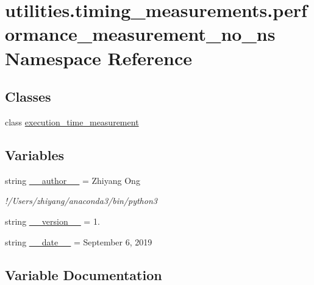 \hypertarget{namespaceutilities_1_1timing__measurements_1_1performance__measurement__no__ns}{}\section{utilities.\+timing\+\_\+measurements.\+performance\+\_\+measurement\+\_\+no\+\_\+ns Namespace Reference}
\label{namespaceutilities_1_1timing__measurements_1_1performance__measurement__no__ns}
\subsection*{Classes}
\begin{DoxyCompactItemize}
\item 
class \hyperlink{classutilities_1_1timing__measurements_1_1performance__measurement__no__ns_1_1execution__time__measurement}{execution\+\_\+time\+\_\+measurement}
\end{DoxyCompactItemize}
\subsection*{Variables}
\begin{DoxyCompactItemize}
\item 
string \hyperlink{namespaceutilities_1_1timing__measurements_1_1performance__measurement__no__ns_ad21212ef2a99b878f1d71f04b282ee93}{\+\_\+\+\_\+author\+\_\+\+\_\+} = \textquotesingle{}Zhiyang Ong\textquotesingle{}
\begin{DoxyCompactList}\small\item\em !/\+Users/zhiyang/anaconda3/bin/python3 \end{DoxyCompactList}\item 
string \hyperlink{namespaceutilities_1_1timing__measurements_1_1performance__measurement__no__ns_aad2678d45f225046185eb85ebe3cdc6a}{\+\_\+\+\_\+version\+\_\+\+\_\+} = \textquotesingle{}1.\textquotesingle{}
\item 
string \hyperlink{namespaceutilities_1_1timing__measurements_1_1performance__measurement__no__ns_a7b90e234766add970bbe1b7f69e543b9}{\+\_\+\+\_\+date\+\_\+\+\_\+} = \textquotesingle{}September 6, 2019\textquotesingle{}
\end{DoxyCompactItemize}


\subsection{Variable Documentation}
\hypertarget{namespaceutilities_1_1timing__measurements_1_1performance__measurement__no__ns_ad21212ef2a99b878f1d71f04b282ee93}{}
